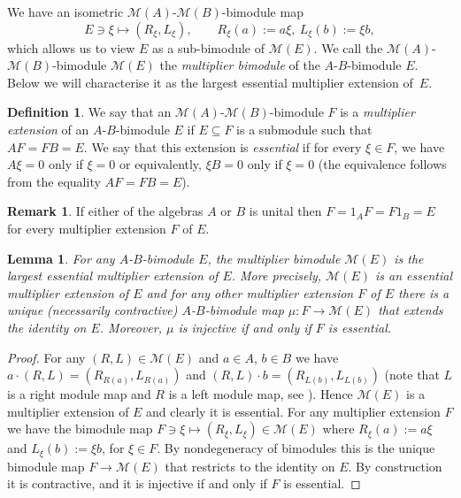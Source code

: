 \documentclass[11 pt, leqno]{amsart}
\numberwithin{equation}{section}
\theoremstyle{plain}
\newtheorem {lem} [thm]{Lemma}
\theoremstyle{definition}
\newtheorem {defn}[thm] {Definition}
\newtheorem {rem} [thm]{Remark}
\newcommand{\M}{\mathcal M}
\begin{document}
We have an isometric $\M(A)$-$\M(B)$-bimodule map 
\[
    E\ni \xi \longmapsto (R_\xi,L_\xi), \qquad 
    R_\xi(a):=a\xi,\ L_\xi(b):=\xi b,
\]
which allows us to view $E$ as a sub-bimodule of $\M(E)$.
We call the $\M(A)$-$\M(B)$-bimodule $\M(E)$ the \emph{multiplier bimodule} of the $A$-$B$-bimodule $E$.
Below we will characterise it as the largest essential multiplier extension of~$E$.

\begin{defn}\label{defn:multiplier_extensions}
We say that an $\M(A)$-$\M(B)$-bimodule $F$ is a \emph{multiplier extension} of an $A$-$B$-bimodule $E$ if $E\subseteq F$ is a submodule such that $AF=FB=E$. 
We say that this extension is \emph{essential} if for every $\xi \in F$, we have $A\xi=0$  only if $\xi=0$ or equivalently, $\xi B=0$  only if $\xi=0$ (the equivalence follows from the equality $AF=FB=E$).
\end{defn}

\begin{rem}
If either of the algebras $A$ or $B$ is unital then $F=1_AF=F1_B=E$ for every multiplier extension $F$ of $E$.
\end{rem}

\begin{lem}\label{lem:universal_characterisation_of_multipliers}
For any $A$-$B$-bimodule $E$, the multiplier bimodule $\M(E)$ is the largest essential multiplier extension of $E$. 
More precisely, $\M(E)$ is an essential multiplier extension of $E$ and for any other multiplier extension $F$ of $E$ there is a unique (necessarily contractive) 
$A$-$B$-bimodule map $\mu:F\to \M(E)$ that extends the identity on $E$. 
Moreover, $\mu$ is injective if and only if $F$ is essential. 
\end{lem}
\begin{proof}
For any $(R,L)\in \M(E)$ and $a\in A$, $b\in B$ we have $a\cdot (R,L)=(R_{R(a)},L_{R(a)})$ and $(R,L)\cdot b=(R_{L(b)},L_{L(b)})$ (note that $L$ is a right module map and $R$ is a left module map, see \cite[Lemma 2.1]{Daws}). 
Hence $\M(E)$ is a multiplier extension of $E$ and clearly it is essential. 
For any multiplier extension $F$ we have the bimodule map $F\ni \xi \mapsto (R_\xi, L_{\xi})\in \M(E)$ where $R_{\xi}(a):=a \xi$ and $L_\xi(b):=\xi b$, for $\xi \in F$.
By nondegeneracy of bimodules this is the unique bimodule map $F\to \M(E)$ that restricts to the identity on $E$.  
By construction it is contractive, and it is injective if and only if $F$ is essential. 
\end{proof}
\end{document}
